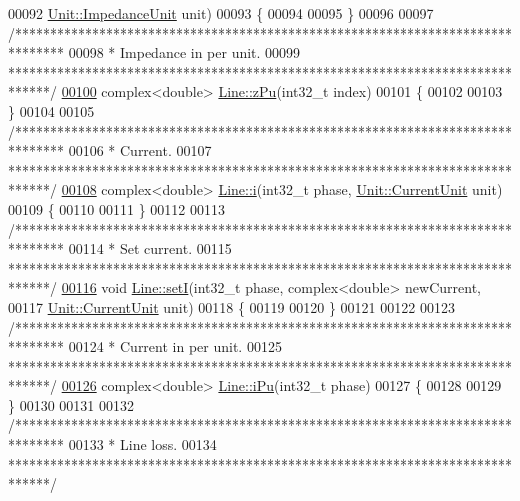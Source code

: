 \begin{DoxyCode}
00092                 \hyperlink{class_unit_a3747e779c805df24a71961290be3fbdf}{Unit::ImpedanceUnit} unit)
00093 \{
00094 
00095 \}
00096 
00097 \textcolor{comment}{/*******************************************************************************}
00098 \textcolor{comment}{ * Impedance in per unit.}
00099 \textcolor{comment}{ ******************************************************************************/}
\hypertarget{line_8cpp_source_l00100}{}\hyperlink{group___models_ga139698332327a712f6c02d96fe73fbee}{00100} complex<double> \hyperlink{group___models_ga139698332327a712f6c02d96fe73fbee}{Line::zPu}(int32\_t index)
00101 \{
00102 
00103 \}
00104 
00105 \textcolor{comment}{/*******************************************************************************}
00106 \textcolor{comment}{ * Current.}
00107 \textcolor{comment}{ ******************************************************************************/}
\hypertarget{line_8cpp_source_l00108}{}\hyperlink{group___models_gaf81e7055102816465bdf7e19afc2d547}{00108} complex<double> \hyperlink{group___models_gaf81e7055102816465bdf7e19afc2d547}{Line::i}(int32\_t phase, \hyperlink{class_unit_a0794cf6c9682f48296dd4a5315389787}{Unit::CurrentUnit} unit)
00109 \{
00110 
00111 \}
00112 
00113 \textcolor{comment}{/*******************************************************************************}
00114 \textcolor{comment}{ * Set current.}
00115 \textcolor{comment}{ ******************************************************************************/}
\hypertarget{line_8cpp_source_l00116}{}\hyperlink{group___models_ga9e55b06dc3e385838fdd13d5580438ef}{00116} \textcolor{keywordtype}{void} \hyperlink{group___models_ga9e55b06dc3e385838fdd13d5580438ef}{Line::setI}(int32\_t phase, complex<double> newCurrent,
00117                 \hyperlink{class_unit_a0794cf6c9682f48296dd4a5315389787}{Unit::CurrentUnit} unit)
00118 \{
00119 
00120 \}
00121 
00122 
00123 \textcolor{comment}{/*******************************************************************************}
00124 \textcolor{comment}{ * Current in per unit.}
00125 \textcolor{comment}{ ******************************************************************************/}
\hypertarget{line_8cpp_source_l00126}{}\hyperlink{group___models_ga8f71e477800134586652d283087ed373}{00126} complex<double> \hyperlink{group___models_ga8f71e477800134586652d283087ed373}{Line::iPu}(int32\_t phase)
00127 \{
00128 
00129 \}
00130 
00131 
00132 \textcolor{comment}{/*******************************************************************************}
00133 \textcolor{comment}{ * Line loss.}
00134 \textcolor{comment}{ ******************************************************************************/}

\end{DoxyCode}
